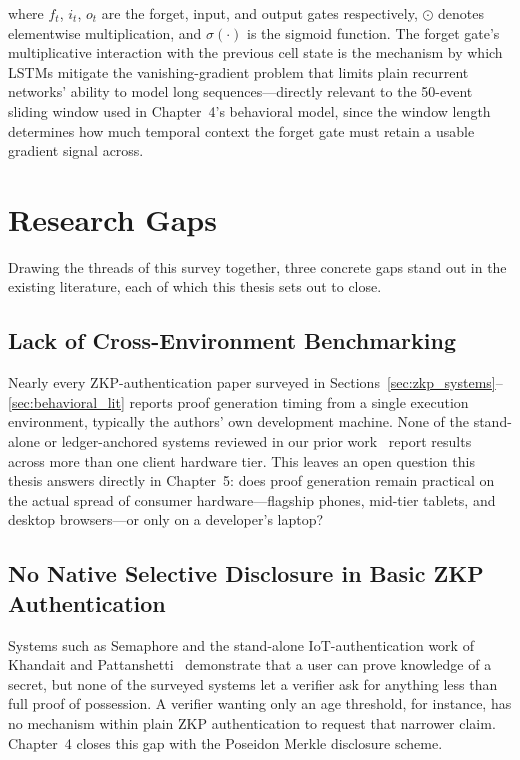 \documentclass[12pt,a4paper,oneside]{report}
\begin{document}
\noindent where $f_t$, $i_t$, $o_t$ are the forget, input, and output
gates respectively, $\odot$ denotes elementwise multiplication, and
$\sigma(\cdot)$ is the sigmoid function. The forget gate's multiplicative
interaction with the previous cell state is the mechanism by which LSTMs
mitigate the vanishing-gradient problem that limits plain recurrent
networks' ability to model long sequences---directly relevant to the
50-event sliding window used in Chapter~4's behavioral model, since the
window length determines how much temporal context the forget gate must
retain a usable gradient signal across.

\section{Research Gaps}

Drawing the threads of this survey together, three concrete gaps stand
out in the existing literature, each of which this thesis sets out to
close.

\subsection{Lack of Cross-Environment Benchmarking}

Nearly every ZKP-authentication paper surveyed in
Sections~\ref{sec:zkp_systems}--\ref{sec:behavioral_lit} reports proof
generation timing from a single execution environment, typically the
authors' own development machine. None of the stand-alone or
ledger-anchored systems reviewed in our prior
work~\cite{dandge2025zkpcloud} report results across more than one
client hardware tier. This leaves an open question this thesis answers
directly in Chapter~5: does proof generation remain practical on the
actual spread of consumer hardware---flagship phones, mid-tier tablets,
and desktop browsers---or only on a developer's laptop?

\subsection{No Native Selective Disclosure in Basic ZKP Authentication}

Systems such as Semaphore and the stand-alone
IoT-authentication work of Khandait and
Pattanshetti~\cite{khandait2024} demonstrate that a user can prove
knowledge of a secret, but none of the surveyed systems let a verifier
ask for anything less than full proof of possession. A verifier wanting
only an age threshold, for instance, has no mechanism within plain ZKP
authentication to request that narrower claim. Chapter~4 closes this gap
with the Poseidon Merkle disclosure scheme.
\end{document}
